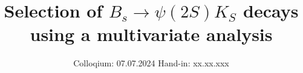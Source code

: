 

\subject{V\_LHCbMVA}
\title{Selection of \texorpdfstring{$B_s \to \psi(2S)K_S$}{B_s -> Psi(2S)K_S} decays using a multivariate analysis}
\date{%
  Colloqium: 07.07.2024
  \hspace{3em}
  Hand-in: xx.xx.xxx
}
\newcommand{\signal}{$B_s \to \psi(2S)K_S$}

\usepackage{tikz}
\usepackage{tikz-feynman}




\maketitle
\thispagestyle{empty}
\tableofcontents
\newpage






\printbibliography{}


